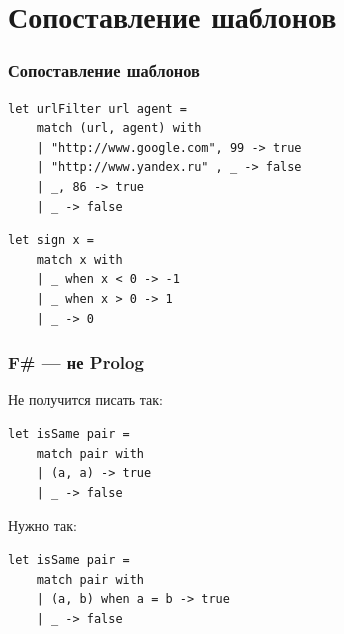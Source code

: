 \documentclass[xetex,mathserif,serif]{beamer}
\begin{document}
	\section{Сопоставление шаблонов}
	
	\begin{frame}[fragile]
		\frametitle{Сопоставление шаблонов}
		\begin{verbatim}
let urlFilter url agent =
    match (url, agent) with
    | "http://www.google.com", 99 -> true
    | "http://www.yandex.ru" , _ -> false
    | _, 86 -> true
    | _ -> false
		\end{verbatim}

		\begin{verbatim}
let sign x =
    match x with
    | _ when x < 0 -> -1
    | _ when x > 0 -> 1
    | _ -> 0
		\end{verbatim}
	\end{frame}

	\begin{frame}[fragile]
		\frametitle{F\# --- не Prolog}
		Не получится писать так:
		\begin{verbatim}
let isSame pair =
    match pair with
    | (a, a) -> true
    | _ -> false
		\end{verbatim}
		Нужно так:
		\begin{verbatim}
let isSame pair =
    match pair with
    | (a, b) when a = b -> true
    | _ -> false
		\end{verbatim}
	\end{frame}
\end{document}
